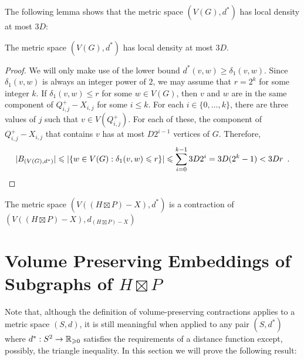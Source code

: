 \documentclass{patmorin}
\renewcommand{\ge}{\geqslant}
\renewcommand{\le}{\leqslant}
\newcommand{\pat}[1]{\textcolor{Maroon}{Pat: #1}}
\begin{document}
The following lemma shows that the metric space $(V(G),d^*)$ has local density at most $3D$:

\begin{lem}
  The metric space $(V(G),d^*)$ has local density at most $3D$.
\end{lem}

\begin{proof}
  We will only make use of the lower bound $d^*(v,w)\ge \delta_1(v,w)$.
  Since $\delta_1(v,w)$ is always an integer power of $2$, we may assume that $r=2^k$ for some integer $k$.  If $\delta_1(v,w)\le r$ for some $w\in V(G)$, then $v$ and $w$ are in the same component of $Q^+_{i,j}-X_{i,j}$ for some $i \le k$.  For each $i\in\{0,\ldots,k\}$, there are three values of $j$ such that $v\in V(Q^+_{i,j})$.  For each of these, the component of $Q^+_{i,j}-X_{i,j}$ that contains $v$ has at most $D2^{i-1}$ vertices of $G$. Therefore,
  \[
    |B_{(V(G),d^*)}| \le |\{w\in V(G): \delta_1(v,w)\le r\}| \le \sum_{i=0}^{k-1} 3D2^{i} = 3D(2^{k}-1) < 3Dr \enspace . \qedhere
  \]
\end{proof}

\begin{lem}
    The metric space $(V((H\boxtimes P)-X),d^*)$ is a contraction of $(V((H\boxtimes P)-X),d_{(H\boxtimes P)-X})$
    
\end{lem}


\section{\boldmath Volume Preserving Embeddings of Subgraphs of $H\boxtimes P$}




Note that, although the definition of volume-preserving contractions applies to a metric space $(S,d)$, it is still meaningful when applied to any pair $(S,d^*)$ where $d^*:S^2\to\R_{\ge 0}$ satisfies the requirements of a distance function except, possibly, the triangle inequality.  In this section we will prove the following result:
\end{document}
